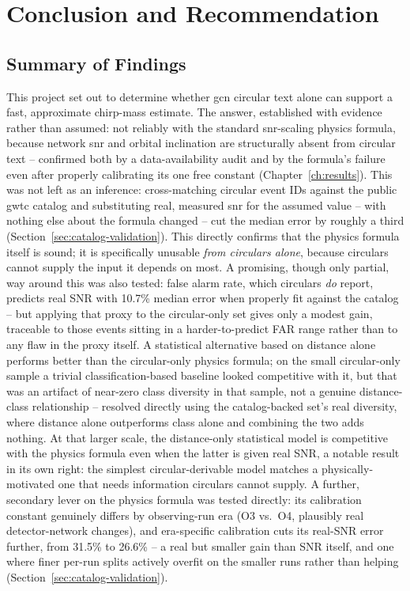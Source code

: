 \chapter{Conclusion and Recommendation}
\label{ch:conclusion}

\section{Summary of Findings}

This project set out to determine whether \gls{gcn} circular text alone can support a fast, approximate chirp-mass estimate. The answer, established with evidence rather than assumed: not reliably with the standard \gls{snr}-scaling physics formula, because network \gls{snr} and orbital inclination are structurally absent from circular text -- confirmed both by a data-availability audit and by the formula's failure even after properly calibrating its one free constant (Chapter~\ref{ch:results}). This was not left as an inference: cross-matching circular event IDs against the public \gls{gwtc} catalog and substituting real, measured \gls{snr} for the assumed value -- with nothing else about the formula changed -- cut the median error by roughly a third (Section~\ref{sec:catalog-validation}). This directly confirms that the physics formula itself is sound; it is specifically unusable \emph{from circulars alone}, because circulars cannot supply the input it depends on most. A promising, though only partial, way around this was also tested: false alarm rate, which circulars \emph{do} report, predicts real SNR with 10.7\% median error when properly fit against the catalog -- but applying that proxy to the circular-only set gives only a modest gain, traceable to those events sitting in a harder-to-predict FAR range rather than to any flaw in the proxy itself. A statistical alternative based on distance alone performs better than the circular-only physics formula; on the small circular-only sample a trivial classification-based baseline looked competitive with it, but that was an artifact of near-zero class diversity in that sample, not a genuine distance-class relationship -- resolved directly using the catalog-backed set's real diversity, where distance alone outperforms class alone and combining the two adds nothing. At that larger scale, the distance-only statistical model is competitive with the physics formula even when the latter is given real SNR, a notable result in its own right: the simplest circular-derivable model matches a physically-motivated one that needs information circulars cannot supply. A further, secondary lever on the physics formula was tested directly: its calibration constant genuinely differs by observing-run era (O3 vs.\ O4, plausibly real detector-network changes), and era-specific calibration cuts its real-SNR error further, from 31.5\% to 26.6\% -- a real but smaller gain than SNR itself, and one where finer per-run splits actively overfit on the smaller runs rather than helping (Section~\ref{sec:catalog-validation}).

